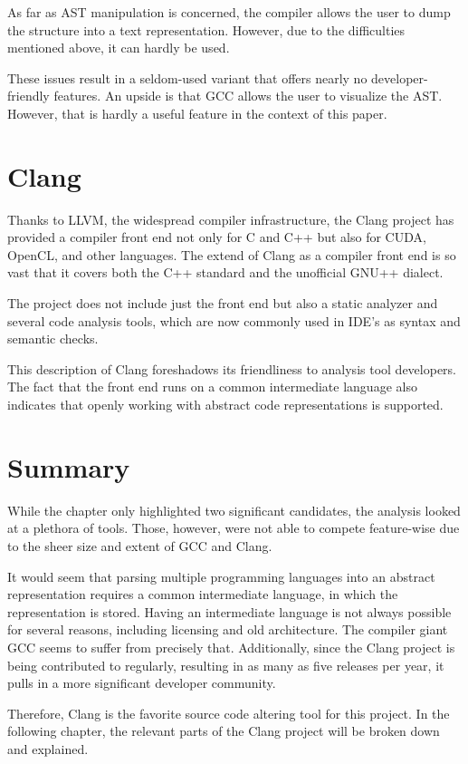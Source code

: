 As far as AST manipulation is concerned, the compiler allows the user to dump 
the structure into a text representation. 
However, due to the difficulties mentioned above, it can hardly be used.


These issues result in a seldom-used variant that offers nearly 
no developer-friendly features. 
An upside is that GCC allows the user to visualize the AST. 
However, that is hardly a useful feature in the context of this paper.

\section{Clang}

Thanks to LLVM, the widespread compiler infrastructure, the Clang project 
has provided a compiler front end not only for C and C++ but also 
for CUDA, OpenCL, and other languages. 
The extend of Clang as a compiler front end is so vast that it covers 
both the C++ standard and the unofficial GNU++ dialect.

The project does not include just the front end but also a static analyzer 
and several code analysis tools, which are now commonly used in IDE's as 
syntax and semantic checks. 

This description of Clang foreshadows its friendliness to analysis tool developers. 
The fact that the front end runs on a common intermediate language also indicates 
that openly working with abstract code representations is supported.


\section{Summary}

While the chapter only highlighted two significant candidates, the analysis 
looked at a plethora of tools. 
Those, however, were not able to compete feature-wise due to the sheer size 
and extent of GCC and Clang. 

It would seem that parsing multiple programming languages into an abstract 
representation requires a common intermediate language, in which 
the representation is stored. 
Having an intermediate language is not always possible for several reasons, 
including licensing and old architecture. 
The compiler giant GCC seems to suffer from precisely that.
Additionally, since the Clang project is being contributed to regularly, 
resulting in as many as five releases per year, 
it pulls in a more significant developer community. 

Therefore, Clang is the favorite source code altering tool for this project. 
In the following chapter, the relevant parts of the Clang project 
will be broken down and explained.
